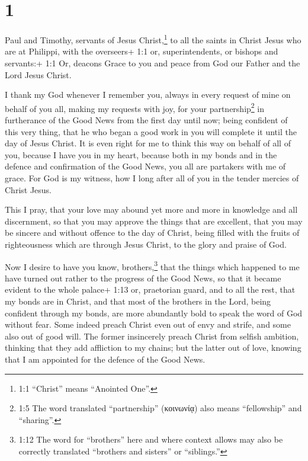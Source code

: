\hypertarget{section}{%
\section{1}\label{section}}

 Paul and Timothy, servants of Jesus Christ,\footnote{1:1
  ``Christ'' means ``Anointed One''.} to all the saints in Christ Jesus
who are at Philippi, with the overseers+ 1:1 or, superintendents, or
bishops and servants:+ 1:1 Or, deacons  Grace to you and
peace from God our Father and the Lord Jesus Christ.

 I thank my God whenever I remember you,  always
in every request of mine on behalf of you all, making my requests with
joy,  for your partnership\footnote{1:5 The word translated
  ``partnership'' (κοινωνίᾳ) also means ``fellowship'' and ``sharing''.}
in furtherance of the Good News from the first day until now;
 being confident of this very thing, that he who began a
good work in you will complete it until the day of Jesus Christ.
 It is even right for me to think this way on behalf of all
of you, because I have you in my heart, because both in my bonds and in
the defence and confirmation of the Good News, you all are partakers
with me of grace.  For God is my witness, how I long after
all of you in the tender mercies of Christ Jesus.

 This I pray, that your love may abound yet more and more in
knowledge and all discernment,  so that you may approve the
things that are excellent, that you may be sincere and without offence
to the day of Christ,  being filled with the fruits of
righteousness which are through Jesus Christ, to the glory and praise of
God.

 Now I desire to have you know, brothers,\footnote{1:12 The
  word for ``brothers'' here and where context allows may also be
  correctly translated ``brothers and sisters'' or ``siblings.''} that
the things which happened to me have turned out rather to the progress
of the Good News,  so that it became evident to the whole
palace+ 1:13 or, praetorian guard, and to all the rest, that my bonds
are in Christ,  and that most of the brothers in the Lord,
being confident through my bonds, are more abundantly bold to speak the
word of God without fear.  Some indeed preach Christ even
out of envy and strife, and some also out of good will. 
The former insincerely preach Christ from selfish ambition, thinking
that they add affliction to my chains;  but the latter out
of love, knowing that I am appointed for the defence of the Good News.

